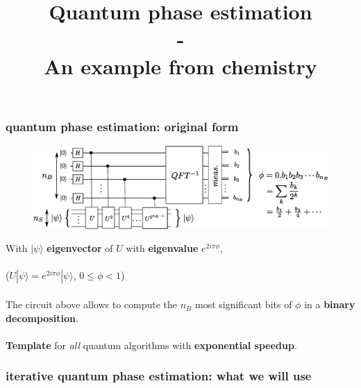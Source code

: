 \documentclass{beamer}
\title{Quantum phase estimation \\-\\ An example from chemistry}
\begin{document}
\frame{\titlepage}

\begin{frame}
\frametitle{quantum phase estimation: original form}
\begin{center}
\begin{figure}
\includegraphics[width=\textwidth]{quantum_phase_estimation.eps}
\end{figure}
\end{center}

With $|\psi\rangle$ \textbf{eigenvector} of $U$ with \textbf{eigenvalue} $e^{2i\pi\phi}$,\\~\\
 ($U|\psi\rangle = e^{2i\pi\phi}|\psi\rangle$, $0\leq\phi<1$)\\~\\
The circuit above allows to compute the $n_{B}$ most significant bits of $\phi$ in a \textbf{binary
decomposition}.\\~\\

\textbf{Template} for \emph{all} quantum algorithms with \textbf{exponential speedup}.
\end{frame}

\begin{frame}
\frametitle{iterative quantum phase estimation: what we will use}



\end{frame}
\end{document}
